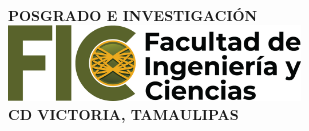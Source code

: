 \begin{titlepage}
\centering
\\ %
{\large\bfseries POSGRADO E INVESTIGACIÓN}
\vfill
{\large\bfseries \MakeUppercase\elTitulo}
\vfill
{\large\bfseries \MakeUppercase\elEstudiante}
\vfill
{\large\bfseries \MakeUppercase{\tipoDocumento}}\\
\vspace{0.3cm}
{\large\bfseries \MakeUppercase{\elPrograma}}
\vfill
\includegraphics[height=2cm,width=7.75cm]{logos/fic.png}\\
\vspace{0.3cm} %
\begingroup
    \singlespacing
    {\large\bfseries \MakeUppercase{CD VICTORIA, TAMAULIPAS}}\\
    \vspace{-0.3cm} %
    {\large\bfseries \MakeUppercase\elanioTesis}
\endgroup
\end{titlepage}
